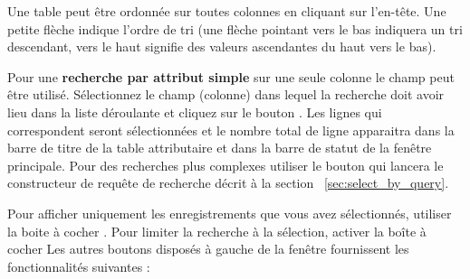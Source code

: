Une table peut être ordonnée sur toutes colonnes en cliquant sur l'en-tête. Une petite 
flèche indique l'ordre de tri (une flèche pointant vers le bas indiquera un tri 
descendant, vers le haut signifie des valeurs ascendantes du haut vers le bas).

Pour une \textbf{recherche par attribut simple} sur une seule colonne le champ 
 peut être utilisé. Sélectionnez le champ (colonne) dans lequel 
la recherche doit avoir lieu dans la liste déroulante et cliquez sur le bouton 
. Les lignes qui correspondent seront sélectionnées et le nombre 
total de ligne apparaitra dans la barre de titre de la table attributaire et dans 
la barre de statut de la fenêtre principale. Pour des recherches plus complexes 
utiliser le bouton  qui lancera le constructeur de 
requête de recherche décrit à la section~ \ref{sec:select_by_query}.

Pour afficher uniquement les enregistrements que vous avez sélectionnés, utiliser 
la boite à cocher . 
Pour limiter la recherche à la sélection, activer la boîte à cocher 
 Les autres 
boutons disposés à gauche de la fenêtre fournissent les fonctionnalités 
suivantes :

